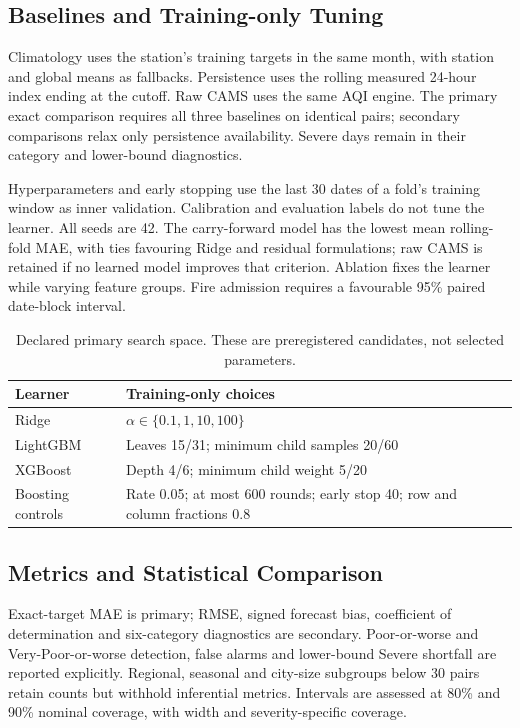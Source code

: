 \documentclass[journal]{IEEEtran}
\begin{document}
\subsection{Baselines and Training-only Tuning}
Climatology uses the station's training targets in the same month, with
station and global means as fallbacks. Persistence uses the rolling measured
24-hour index ending at the cutoff. Raw CAMS uses the same AQI engine.
The primary exact comparison requires all three baselines on identical pairs;
secondary comparisons relax only persistence availability. Severe days remain
in their category and lower-bound diagnostics.

Hyperparameters and early stopping use the last 30 dates of a fold's training
window as inner validation. Calibration and evaluation labels do not tune the
learner. All seeds are 42. The carry-forward model has the lowest mean
rolling-fold MAE, with ties favouring Ridge and residual formulations; raw
CAMS is retained if no learned model improves that criterion. Ablation fixes
the learner while varying feature groups. Fire admission requires a favourable
95\% paired date-block interval.
\begin{table}[t]\centering\footnotesize
\caption{Declared primary search space. These are preregistered candidates, not selected parameters.}
\label{tab:search}
\setlength{\tabcolsep}{4pt}
\begin{tabular}{lp{}}
\toprule
Learner & Training-only choices\\\midrule
Ridge & $\alpha\in\{0.1,1,10,100\}$\\
LightGBM & Leaves 15/31; minimum child samples 20/60\\
XGBoost & Depth 4/6; minimum child weight 5/20\\
Boosting controls & Rate 0.05; at most 600 rounds; early stop 40; row and column fractions 0.8\\
\bottomrule\end{tabular}
\end{table}
\subsection{Metrics and Statistical Comparison}
Exact-target MAE is primary; RMSE, signed forecast bias, coefficient of
determination and six-category diagnostics are secondary. Poor-or-worse and
Very-Poor-or-worse detection, false alarms and lower-bound Severe shortfall
are reported explicitly. Regional, seasonal and city-size subgroups below
30 pairs retain counts but withhold inferential metrics. Intervals are assessed
at 80\% and 90\% nominal coverage, with width and severity-specific coverage.
\end{document}
